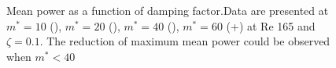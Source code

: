 \begin{figure}
\setlength{\unitlength}{\textwidth}
  \caption{Mean power as a function of damping factor.Data are presented at $m^*=10$ (), $m^*=20$ (), $m^*=40$ (), $m^*=60$ (+) at Re 165 and $\zeta=0.1$. The reduction of maximum mean power could be observed when $m^*<40$}
    \label{fig:m_star_mean_power}
\end{figure}